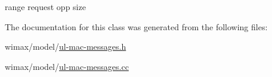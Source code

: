 range request opp size 



The documentation for this class was generated from the following files\+:\begin{DoxyCompactItemize}
\item 
wimax/model/\hyperlink{ul-mac-messages_8h}{ul-\/mac-\/messages.\+h}\item 
wimax/model/\hyperlink{ul-mac-messages_8cc}{ul-\/mac-\/messages.\+cc}\end{DoxyCompactItemize}
